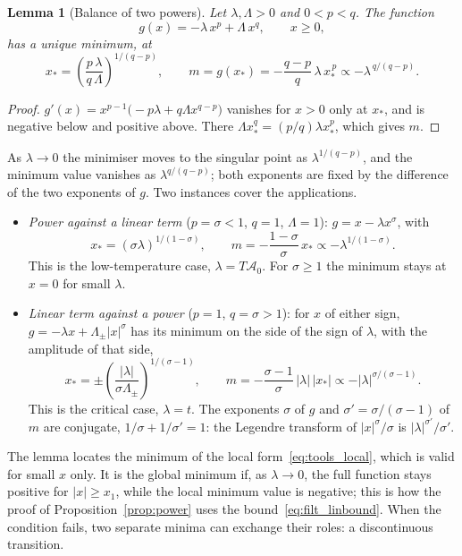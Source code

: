 \documentclass[10pt,a4paper]{article}
\theoremstyle{plain}
\newtheorem{lemma}{Lemma}
\newcommand{\cA}{{\mathcal{A}_0}}   %
\begin{document}
\begin{lemma}[Balance of two powers]\label{lem:balance}
Let $\lambda,\Lambda>0$ and $0<p<q$. The function
\begin{equation}\label{eq:tools_g2}
  g(x)=-\lambda\,x^{p}+\Lambda\,x^{q} , \qquad x\ge0 ,
\end{equation}
has a unique minimum, at
\begin{equation}\label{eq:tools_xstar}
  x_*=\left(\frac{p\,\lambda}{q\,\Lambda}\right)^{1/(q-p)} ,
  \qquad
  m=g(x_*)=-\frac{q-p}{q}\,\lambda\,x_*^{\,p}
  \propto-\lambda^{\,q/(q-p)} .
\end{equation}
\end{lemma}
\begin{proof}
$g'(x)=x^{p-1}\big(-p\lambda+q\Lambda x^{q-p}\big)$ vanishes for $x>0$ only at
$x_*$, and is negative below and positive above. There
$\Lambda x_*^{q}=(p/q)\lambda x_*^{p}$, which gives $m$.
\end{proof}
As $\lambda\to0$ the minimiser moves to the singular point as
$\lambda^{1/(q-p)}$, and the minimum value vanishes as $\lambda^{q/(q-p)}$;
both exponents are fixed by the difference of the two exponents of $g$. Two
instances cover the applications.
\begin{itemize}\setlength{\itemsep}{2pt}
\item \emph{Power against a linear term} ($p=\sigma<1$, $q=1$, $\Lambda=1$):
  $g=x-\lambda x^{\sigma}$, with
  \begin{equation}\label{eq:tools_edge}
    x_*=(\sigma\lambda)^{1/(1-\sigma)} ,\qquad
    m=-\frac{1-\sigma}{\sigma}\,x_*\propto-\lambda^{1/(1-\sigma)} .
  \end{equation}
  This is the low-temperature case, $\lambda=T\cA$. For $\sigma\ge1$ the
  minimum stays at $x=0$ for small $\lambda$.
\item \emph{Linear term against a power} ($p=1$, $q=\sigma>1$): for $x$ of
  either sign, $g=-\lambda x+\Lambda_\pm|x|^{\sigma}$ has its minimum on the
  side of the sign of $\lambda$, with the amplitude of that side,
  \begin{equation}\label{eq:tools_crit}
    x_*=\pm\left(\frac{|\lambda|}{\sigma\Lambda_\pm}\right)^{1/(\sigma-1)} ,\qquad
    m=-\frac{\sigma-1}{\sigma}\,|\lambda|\,|x_*|\propto-|\lambda|^{\sigma/(\sigma-1)} .
  \end{equation}
  This is the critical case, $\lambda=t$. The exponents $\sigma$ of $g$ and
  $\sigma'=\sigma/(\sigma-1)$ of $m$ are conjugate,
  $1/\sigma+1/\sigma'=1$: the Legendre transform of $|x|^{\sigma}/\sigma$ is
  $|\lambda|^{\sigma'}/\sigma'$.
\end{itemize}
The lemma locates the minimum of the local form~\eqref{eq:tools_local},
which is valid for small $x$ only. It is the global minimum if, as
$\lambda\to0$, the full function stays positive for $|x|\ge x_1$, while the
local minimum value is negative; this is how the proof of
Proposition~\ref{prop:power} uses the bound~\eqref{eq:filt_linbound}. When
the condition fails, two separate minima can exchange their roles: a
discontinuous transition.
\end{document}
